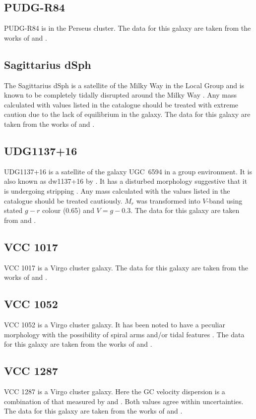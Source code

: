 \subsection{PUDG-R84}
PUDG-R84 is in the Perseus cluster. The data for this galaxy are taken from the works of \citet{Gannon2022, Janssens2024} and \citet{FerreMateu2023}. 

\subsection{Sagittarius dSph}
The Sagittarius dSph is a satellite of the Milky Way in the Local Group and is known to be completely tidally disrupted around the Milky Way \citep{Ibata2001}. Any mass calculated with values listed in the catalogue should be treated with extreme caution due to the lack of equilibrium in the galaxy. The data for this galaxy are taken from the works of \citet{mcconnachie2012, Karachentsev2017} and \citet{Forbes2018}.

\subsection{UDG1137+16}
UDG1137+16 is a satellite of the galaxy UGC~6594 in a group environment. It is also known as dw1137+16 by \citet{Muller2018}. It has a disturbed morphology suggestive that it is undergoing stripping \citep{Gannon2021}. Any mass calculated with the values listed in the catalogue should be treated cautiously. $M_r$ was transformed into $V$-band using stated $g-r$ colour (0.65) and $V=g-0.3$. The data for this galaxy are taken from \citet{Gannon2021} and \citet{FerreMateu2023}.

\subsection{VCC 1017}
VCC 1017 is a Virgo cluster galaxy. The data for this galaxy are taken from the works of \citet{Lim2020} and \citet{Toloba2023}.

\subsection{VCC 1052}
VCC 1052 is a Virgo cluster galaxy. It has been noted to have a peculiar morphology with the possibility of spiral arms and/or tidal features \citep{Lim2020}. The data for this galaxy are taken from the works of \citet{Lim2020} and \citet{Toloba2023}.

\subsection{VCC 1287}
VCC 1287 is a Virgo cluster galaxy. Here the GC velocity dispersion is a combination of that measured by \citet[33$^{+16}_{-10}$]{Beasley2016} and \citet[39$^{+20}_{-12}$]{Toloba2023}. Both values agree within uncertainties. The data for this galaxy are taken from the works of \citet{Beasley2016, Gannon2020, Gannon2021, Lim2020} and \citet{Toloba2023}.

